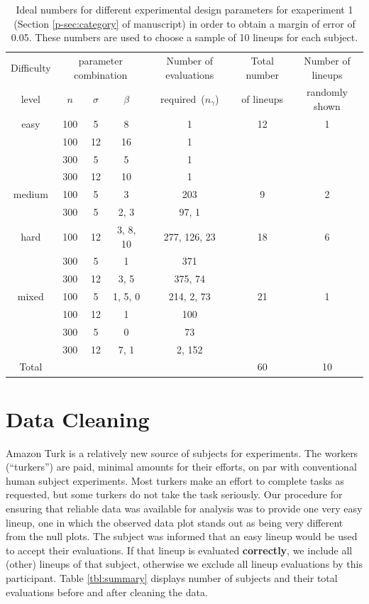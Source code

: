 \documentclass[12pt]{article}
\begin{document}
\begin{table}[hbtp]
\caption{Ideal numbers for different experimental design parameters for exaperiment 1 (Section \ref{p-sec:category} of manuscript) in order to obtain a margin of error of 0.05. These numbers are used to choose a sample of 10 lineups for each subject. } 
\begin{center}
\begin{tabular}{c c c c  c c c}
\hline\hline
Difficulty& \multicolumn{3}{c}{parameter combination}& Number of evaluations &Total number  & Number of lineups\\
 \cline{2-4}
level & $n$ & $\sigma$ & $\beta$ &required~($n_{\gamma}$) & of lineups & randomly shown \\
\hline
easy&100& 5&8 & 1& 12 & 1\\
&100&12&16 &1&&\\
&300& 5&5 &1&&\\
&300&12&10 &1 &&\\
\hline
medium&100& 5&3 &203 & 9 &2\\
&300& 5&2, 3 & 97, 1&&\\
\hline
hard&100&12&3, 8, 10 & 277, 126, 23& 18 &6\\
&300& 5&1 & 371 &&\\
&300&12&3, 5& 375, 74 &&\\
\hline
mixed&100& 5&1, 5, 0& 214, 2, 73 & 21 &1\\
&100&12&1& 100& &\\
&300& 5&0 & 73&&\\
&300&12&7, 1& 2, 152&&\\
\hline
Total &&&&&60&10\\
\hline
\end{tabular}
\end{center}
\label{tbl:dist_lineup1}
\end{table} 

\section{Data Cleaning}\label{sec:data_cleaning}

Amazon Turk is a relatively new source of subjects for experiments. The workers (``turkers'') are paid, minimal amounts for their efforts, on par with conventional human subject experiments. Most turkers make an effort to complete tasks as requested, but some turkers do not take the task seriously. Our procedure for ensuring that reliable data was available for analysis was to provide one very easy lineup, one in which the observed data plot stands out as being very different from the null plots. The subject was informed that an easy lineup would be used to accept their evaluations. %
If that lineup is evaluated {\bf correctly}, we include all (other) lineups of that subject, otherwise we exclude all lineup evaluations by this participant.  Table \ref{tbl:summary} displays number of subjects and their total evaluations before and after cleaning the data.
\end{document}
